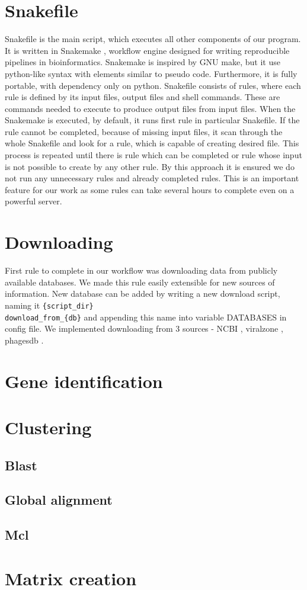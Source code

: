 \section{Snakefile}
Snakefile is the main script, which executes all other components of our program. 
It is written in Snakemake \cite{snakemake}, workflow engine designed for writing reproducible pipelines in bioinformatics. 
Snakemake is inspired by GNU make, but it use python-like syntax with elements similar to pseudo code.
Furthermore, it is fully portable, with dependency only on python.
Snakefile consists of rules, where each rule is defined by its input files, output files and shell commands.
These are commands needed to execute to produce output files from input files.
When the Snakemake is executed, by default, it runs first rule in particular Snakefile. 
If the rule cannot be completed, because of missing input files, it scan through the whole Snakefile and look for a rule, which is capable of creating desired file. 
This process is repeated until there is rule which can be completed or rule whose input is not possible to create by any other rule.
By this approach it is ensured we do not run any unnecessary rules and already completed rules.
This is an important feature for our work as some rules can take several hours to complete even on a powerful server. 

\section{Downloading}
First rule to complete in our workflow was downloading data from publicly available databases.
We made this rule easily extensible for new sources of information.
New database can be added by writing a new download script, 
naming it \texttt{\{script_dir\}\\download\_from\_\{db\}} and appending this name into variable DATABASES in config file.
We implemented downloading from 3 sources - NCBI \cite{ncbi}, viralzone \cite{viralzone}, phagesdb \cite{phagesdb}.

\section{Gene identification}
\section{Clustering}
\subsection{Blast}
\subsection{Global alignment}
\subsection{Mcl}
\section{Matrix creation}
